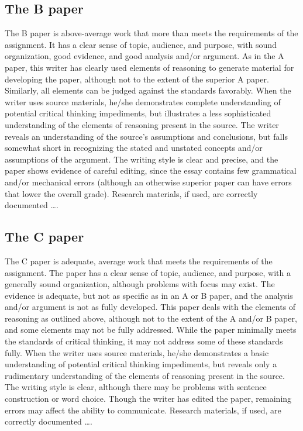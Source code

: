 \subsection{The B paper}

The B paper is above-average work that more than meets the requirements of the assignment. It has a clear sense of topic, audience, and purpose, with sound organization, good evidence, and good analysis and/or argument. As in the A paper, this writer has clearly used elements of reasoning to generate material for developing the paper, although not to the extent of the superior A paper. Similarly, all elements can be judged against the standards favorably. When the writer uses source materials, he/she demonstrates complete understanding of potential critical thinking impediments, but illustrates a less sophisticated understanding of the elements of reasoning present in the source. The writer reveals an understanding of the source’s assumptions and conclusions, but falls somewhat short in recognizing the stated and unstated concepts and/or assumptions of the argument. The writing style is clear and precise, and the paper shows evidence of careful editing, since the essay contains few grammatical and/or mechanical errors (although an otherwise superior paper can have errors that lower the overall grade). Research materials, if used, are correctly documented \dots.
\subsection{The C paper}
The C paper is adequate, average work that meets the requirements of the assignment. The paper has a clear sense of topic, audience, and purpose, with a generally sound organization, although problems with focus may exist. The evidence is adequate, but not as specific as in an A or B paper, and the analysis and/or argument is not as fully developed. This paper deals with the elements of reasoning as outlined above, although not to the extent of the A and/or B paper, and some elements may not be fully addressed. While the paper minimally meets the standards of critical thinking, it may not address some of these standards fully. When the writer uses source materials, he/she demonstrates a basic understanding of potential critical thinking impediments, but reveals only a rudimentary understanding of the elements of reasoning present in the source. The writing style is clear, although there may be problems with sentence construction or word choice. Though the writer has edited the paper, remaining errors may affect the ability to communicate. Research materials, if used, are correctly documented \dots.

